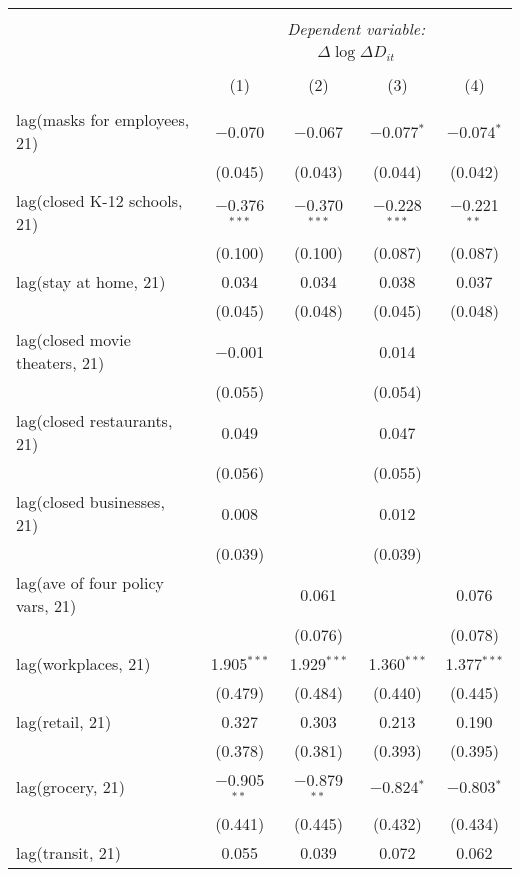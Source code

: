 \begin{tabular}{@{\extracolsep{1pt}}lcccc} 
\\[-1.8ex]\hline 
\hline \\[-1.8ex] 
 & \multicolumn{4}{c}{\textit{Dependent variable:}} \\ 
\cline{2-5} 
 & \multicolumn{4}{c}{$\Delta \log \Delta D_{it}$} \\ 
\\[-1.8ex] & (1) & (2) & (3) & (4)\\ 
\hline \\[-1.8ex] 
 lag(masks for employees, 21) & $-$0.070 & $-$0.067 & $-$0.077$^{*}$ & $-$0.074$^{*}$ \\ 
  & (0.045) & (0.043) & (0.044) & (0.042) \\ 
  lag(closed K-12 schools, 21) & $-$0.376$^{***}$ & $-$0.370$^{***}$ & $-$0.228$^{***}$ & $-$0.221$^{**}$ \\ 
  & (0.100) & (0.100) & (0.087) & (0.087) \\ 
  lag(stay at home, 21) & 0.034 & 0.034 & 0.038 & 0.037 \\ 
  & (0.045) & (0.048) & (0.045) & (0.048) \\ 
  lag(closed movie theaters, 21) & $-$0.001 &  & 0.014 &  \\ 
  & (0.055) &  & (0.054) &  \\ 
  lag(closed restaurants, 21) & 0.049 &  & 0.047 &  \\ 
  & (0.056) &  & (0.055) &  \\ 
  lag(closed businesses, 21) & 0.008 &  & 0.012 &  \\ 
  & (0.039) &  & (0.039) &  \\ 
  lag(ave of four policy vars, 21) &  & 0.061 &  & 0.076 \\ 
  &  & (0.076) &  & (0.078) \\ 
  lag(workplaces, 21) & 1.905$^{***}$ & 1.929$^{***}$ & 1.360$^{***}$ & 1.377$^{***}$ \\ 
  & (0.479) & (0.484) & (0.440) & (0.445) \\ 
  lag(retail, 21) & 0.327 & 0.303 & 0.213 & 0.190 \\ 
  & (0.378) & (0.381) & (0.393) & (0.395) \\ 
  lag(grocery, 21) & $-$0.905$^{**}$ & $-$0.879$^{**}$ & $-$0.824$^{*}$ & $-$0.803$^{*}$ \\ 
  & (0.441) & (0.445) & (0.432) & (0.434) \\ 
  lag(transit, 21) & 0.055 & 0.039 & 0.072 & 0.062 \\ 

\end{tabular}
